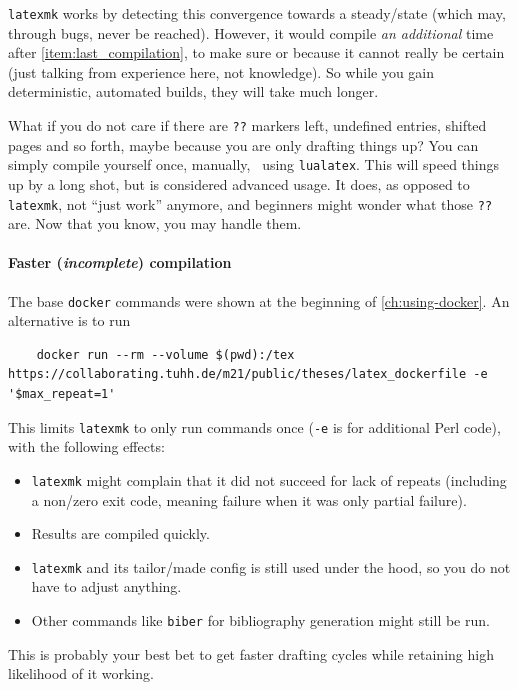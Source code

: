 \texttt{latexmk} works by detecting this convergence towards a steady\-/state (which may, through bugs, never be reached).
However, it would compile \emph{an additional} time after \cref{item:last_compilation}, to make sure or because it cannot really be certain (just talking from experience here, not knowledge).
So while you gain deterministic, automated builds, they will take much longer.

What if you do not care if there are \verb|??| markers left, undefined entries, shifted pages and so forth, maybe because you are only drafting things up?
You can simply compile yourself once, manually, \ using \texttt{lualatex}.
This will speed things up by a long shot, but is considered advanced usage.
It does, as opposed to \texttt{latexmk}, not \enquote{just work} anymore, and beginners might wonder what those \verb|??| are.
Now that you know, you may handle them.

\paragraph{Faster (\emph{incomplete}) compilation}
The base \texttt{docker} commands were shown at the beginning of \cref{ch:using-docker}.
An alternative is to run
\begin{verbatim}
    docker run --rm --volume $(pwd):/tex https://collaborating.tuhh.de/m21/public/theses/latex_dockerfile -e '$max_repeat=1'
\end{verbatim}
This limits \texttt{latexmk} to only run commands once (\texttt{-e} is for additional Perl code), with the following effects:
\begin{itemize}
  \item \texttt{latexmk} might complain that it did not succeed for lack of repeats (including a non\-/zero exit code, meaning failure when it was only partial failure).
  \item Results are compiled quickly.
  \item \texttt{latexmk} and its tailor\-/made config is still used under the hood, so you do not have to adjust anything.
  \item Other commands like \texttt{biber} for bibliography generation might still be run.
\end{itemize}
This is probably your best bet to get faster drafting cycles while retaining high likelihood of it working.

